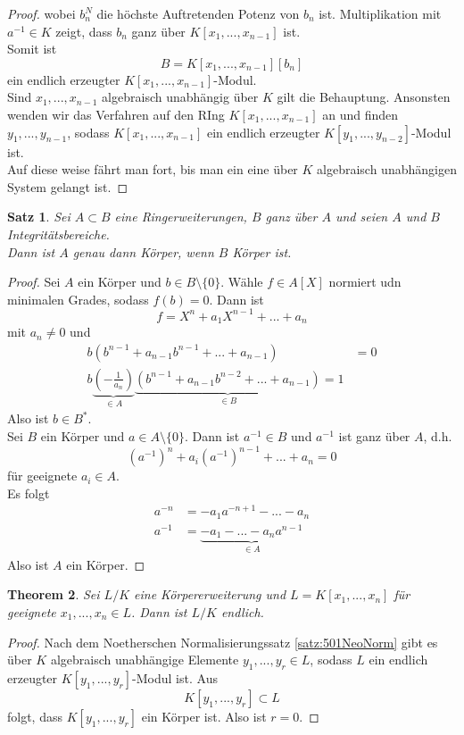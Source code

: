 \documentclass[10pt,a4paper]{article}
\theoremstyle{plain}
\newtheorem{theorem}{Theorem}[section]
\newtheorem{satz}[theorem]{Satz}
\theoremstyle{definition}
\theoremstyle{remark}
\begin{document}
\begin{proof}
		wobei $b_n^N$ die höchste Auftretenden Potenz von $b_n$ ist.
		Multiplikation mit $a^{-1}\in K$ zeigt, dass $b_n$ ganz über $K[x_1,...,x_{n-1}]$ ist.\\
		Somit ist
		\[B=K[x_1,...,x_{n-1}][b_n]\]
		ein endlich erzeugter $K[x_1,...,x_{n-1}]$-Modul.\\
		Sind $x_1,...,x_{n-1}$ algebraisch unabhängig über $K$ gilt die Behauptung. Ansonsten wenden wir das Verfahren auf den RIng $K[x_1,...,x_{n-1}]$ an und finden $y_1,...,y_{n-1}$, sodass $K[x_1,...,x_{n-1}]$ ein endlich erzeugter $K[y_1,...,y_{n-2}]$-Modul ist.\\
		Auf diese weise fährt man fort, bis man ein eine über $K$ algebraisch unabhängigen System gelangt ist.
	\end{proof}

	\begin{satz}
		Sei $A\subset B$ eine Ringerweiterungen, $B$ ganz über $A$ und seien $A$ und $B$ Integritätsbereiche.\\
		Dann ist $A$ genau dann Körper, wenn $B$ Körper ist.
	\end{satz}
	\begin{proof}
		Sei $A$ ein Körper und $b\in B\setminus\{0\}$. Wähle $f\in A[X]$ normiert udn minimalen Grades, sodass $f(b)=0$. Dann ist
		\[f=X^n+a_1X^{n-1}+...+a_n\]
		mit $a_n\neq 0$ und
		\begin{align*}
		b(b^{n-1}+a_{n-1}b^{n-1}+...+a_{n-1})&=0\\
		b\underbrace{\left(-\frac{1}{a_n}\right)}_{\in A}\underbrace{\left(b^{n-1}+a_{n-1}b^{n-2}+...+a_{n-1}\right)}_{\in B}=1
		\end{align*}
		Also ist $b\in B^*$.\\
		Sei $B$ ein Körper und $a\in A\setminus\{0\}$. Dann ist $a^{-1}\in B$ und $a^{-1}$ ist ganz über $A$, d.h.
		\[(a^{-1})^n+a_i(a^{-1})^{n-1}+...+a_n=0\]
		für geeignete $a_i\in A$.\\
		Es folgt 
		\begin{align*}
		a^{-n}&=-a_1a^{-n+1}-...-a_n\\
		a^{-1}&=\underbrace{-a_1-...-a_na^{n-1}}_{\in A}
		\end{align*}
		Also ist $A$ ein Körper.
	\end{proof}


	\begin{theorem}
		Sei $L/K$ eine Körpererweiterung und $L=K[x_1,...,x_n]$ für geeignete $x_1,...,x_n\in L$. Dann ist $L/K$ endlich.
	\end{theorem}
	\begin{proof}
		Nach dem Noetherschen Normalisierungssatz \ref{satz:501NeoNorm} gibt es über $K$ algebraisch unabhängige Elemente $y_1,...,y_r\in L$, sodass $L$ ein endlich erzeugter $K[y_1,...,y_r]$-Modul ist. Aus
		\[K[y_1,...,y_r]\subset L\] 
		folgt, dass $K[y_1,...,y_r]$ ein Körper ist. Also ist $r=0$.
	\end{proof}
\end{document}
